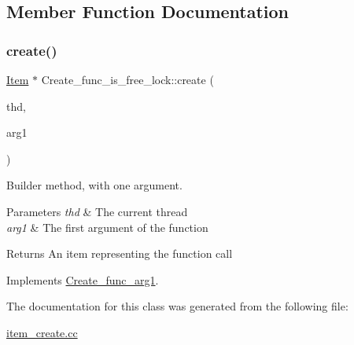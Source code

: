 \subsection{Member Function Documentation}
\mbox{\label{classCreate__func__is__free__lock_a15bf9cc8420b6387216eb0718d2e9fc0}} 
\subsubsection{\texorpdfstring{create()}{create()}}
{\footnotesize\ttfamily \mbox{\hyperlink{classItem}{Item}} $\ast$ Create\+\_\+func\+\_\+is\+\_\+free\+\_\+lock\+::create (\begin{DoxyParamCaption}\item[{T\+HD $\ast$}]{thd,  }\item[{\mbox{\hyperlink{classItem}{Item}} $\ast$}]{arg1 }\end{DoxyParamCaption})\hspace{0.3cm}{\ttfamily [virtual]}}

Builder method, with one argument. 
\begin{DoxyParams}{Parameters}
{\em thd} & The current thread \\
\hline
{\em arg1} & The first argument of the function \\
\hline
\end{DoxyParams}
\begin{DoxyReturn}{Returns}
An item representing the function call 
\end{DoxyReturn}


Implements \mbox{\hyperlink{classCreate__func__arg1_a3e9a98f755cd82c3e762e334c955a8c9}{Create\+\_\+func\+\_\+arg1}}.



The documentation for this class was generated from the following file\+:\begin{DoxyCompactItemize}
\item 
\mbox{\hyperlink{item__create_8cc}{item\+\_\+create.\+cc}}\end{DoxyCompactItemize}
